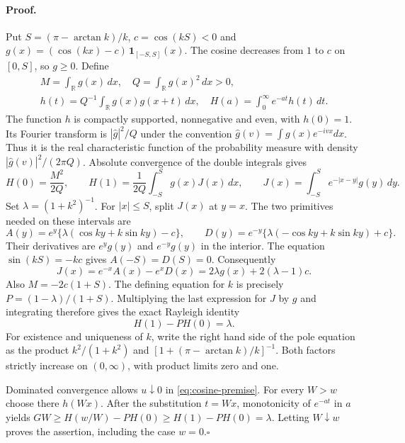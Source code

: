\documentclass[11pt]{article}
\begin{document}
\paragraph{Proof.}
Put $S=(\pi-\arctan k)/k$, $c=\cos(kS)<0$ and
$g(x)=(\cos(kx)-c)\,\mathbf 1_{[-S,S]}(x)$. The cosine decreases from
$1$ to $c$ on $[0,S]$, so $g\ge0$. Define
\[
\begin{gathered} M=\int_{\mathbb R} g(x)\,dx,\quad
 Q=\int_{\mathbb R}g(x)^2\,dx>0,\\
 h(t)=Q^{-1}\int_{\mathbb R} g(x)g(x+t)\,dx,\quad
 H(a)=\int_0^\infty e^{-at}h(t)\,dt.\end{gathered}
\]
The function $h$ is compactly supported, nonnegative and even, with
$h(0)=1$. Its Fourier transform is $|\widehat g|^2/Q$ under the
convention $\widehat g(v)=\int g(x)e^{-ivx}dx$. Thus it is the real
characteristic function of the probability measure with density
$|\widehat g(v)|^2/(2\pi Q)$. Absolute convergence of the double
integrals gives
\[
  H(0)=\frac{M^2}{2Q},\qquad
  H(1)=\frac1{2Q}\int_{-S}^{S}g(x)J(x)\,dx,
 \qquad J(x)=\int_{-S}^{S}e^{-|x-y|}g(y)\,dy .
\]
Set $\lambda=(1+k^2)^{-1}$. For $|x|\le S$, split $J(x)$ at $y=x$.
The two primitives needed on these intervals are
\[
 A(y)=e^y\{\lambda(\cos ky+k\sin ky)-c\},\qquad
 D(y)=e^{-y}\{\lambda(-\cos ky+k\sin ky)+c\}.
\]
Their derivatives are $e^yg(y)$ and $e^{-y}g(y)$ in the interior.
The equation $\sin(kS)=-k c$ gives $A(-S)=D(S)=0$. Consequently
\[
 J(x)=e^{-x}A(x)-e^xD(x)=2\lambda g(x)+2(\lambda-1)c .
\]
Also $M=-2c(1+S)$. The defining equation for $k$ is precisely
$P=(1-\lambda)/(1+S)$. Multiplying the last expression for $J$
by $g$ and integrating therefore gives the exact Rayleigh identity
\begin{equation}
                 H(1)-P H(0)=\lambda .
\label{eq:cosine-rayleigh}
\end{equation}
For existence and uniqueness of $k$, write the right hand side of the
pole equation as the product $k^2/(1+k^2)$ and
$[1+(\pi-\arctan k)/k]^{-1}$. Both factors strictly increase on
$(0,\infty)$, with product limits zero and one.

Dominated convergence allows $u\downarrow0$ in
\eqref{eq:cosine-premise}. For every $W>w$ choose there $h(Wx)$.
After the substitution $t=Wx$, monotonicity of $e^{-at}$ in $a$ yields
$GW\ge H(w/W)-P H(0)\ge H(1)-P H(0)=\lambda$.
Letting $W\downarrow w$ proves the assertion, including the case
$w=0$.\hfill$\square$
\end{document}
